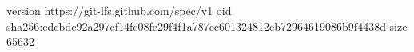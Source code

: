 version https://git-lfs.github.com/spec/v1
oid sha256:cdcbdc92a297ef14fc08fe29f4f1a787cc601324812eb72964619086b9f4438d
size 65632
